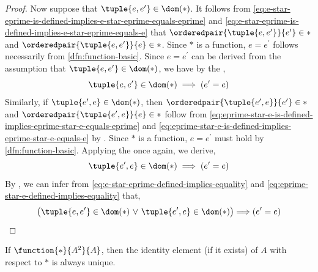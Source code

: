 \begin{proof}
    \noindent
    Now suppose that \( \tuple{e,e^{\prime}} \in \dom (\ast) \). It follows from \eqref{eq:e-star-eprime-is-defined-implies-e-star-eprime-equals-eprime}
    and \eqref{eq:e-star-eprime-is-defined-implies-e-star-eprime-equals-e} that \( \orderedpair{\tuple{e,e^{\prime}}}{e^{\prime}} \in \ast \) and
    \( \orderedpair{\tuple{e,e^{\prime}}}{e} \in \ast \). Since \( \ast \) is a function, \( e = e^{\prime} \) follows necessarily from \cref{dfn:function-basic}.
    Since \( e = e^{\prime} \) can be derived from the assumption that \( \tuple{e,e^{\prime}} \in \dom (\ast) \),
    we have by the ,
    \begin{equation}
        \label{eq:e-star-eprime-defined-implies-equality}
        \tuple{e,e^{\prime}} \in \dom (\ast) \implies \mleft( e^{\prime} = e \mright)
    \end{equation}
    Similarly, if \( \tuple{e^{\prime},e} \in \dom (\ast) \), then
    \( \orderedpair{\tuple{e^{\prime},e}}{e^{\prime}} \in \ast \) and \( \orderedpair{\tuple{e^{\prime},e}}{e} \in \ast \)
    follow from \eqref{eq:eprime-star-e-is-defined-implies-eprime-star-e-equals-eprime} and
    \eqref{eq:eprime-star-e-is-defined-implies-eprime-star-e-equals-e} by .
    Since \( \ast \) is a function, \( e = e^{\prime} \)
    must hold by \cref{dfn:function-basic}. Applying the  once again, we derive,
    \begin{equation}
        \label{eq:eprime-star-e-defined-implies-equality}
        \tuple{e^{\prime},e} \in \dom (\ast) \implies \mleft( e^{\prime} = e \mright)
    \end{equation}
    By , we can infer from \eqref{eq:e-star-eprime-defined-implies-equality}
    and \eqref{eq:eprime-star-e-defined-implies-equality} that,
    \begin{equation*}
        \big( \tuple{e,e^{\prime}} \in \dom (\ast) \,\,{\lor}\,\, \tuple{e^{\prime},e} \in \dom (\ast) \big) {\implies} \mleft( e^{\prime} = e \mright) \qedhere
    \end{equation*}
\end{proof}

\begin{cor}
    \label{cor:uniqueness-of-identity-element-for-total-operations}
    If \( \function{\ast}{A^{2}}{A} \), then the identity element (if it exists) of \( A \) with respect to \( \ast \) is always unique.
\end{cor}

